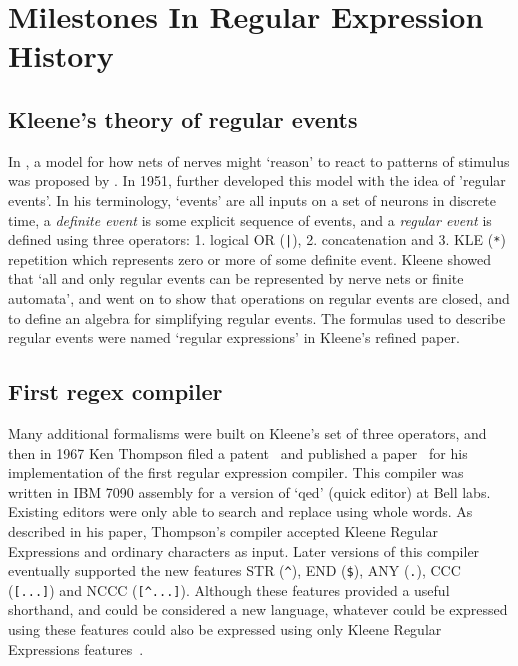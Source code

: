 \section{Milestones In Regular Expression History}

\subsection{Kleene's theory of regular events}
In \citeyear{McCulloch1943Logical}, a model for how nets of nerves might `reason' to react to patterns of stimulus was proposed by \citeauthor{McCulloch1943Logical}.  In 1951, \citeauthor{Kleene1951RAND} further developed this model with the idea of 'regular events'.  In his terminology, `events' are all inputs on a set of neurons in discrete time, a \emph{definite event} is some explicit sequence of events, and a \emph{regular event} is defined using three operators: 1. logical OR (\verb!|!), 2. concatenation and 3. KLE (\verb!*!) repetition which represents zero or more of some definite event.  Kleene showed that `all and only regular events can be represented by nerve nets or finite automata', and went on to show that operations on regular events are closed, and to define an algebra for simplifying regular events.  The formulas used to describe regular events were named `regular expressions' in Kleene's \citeyear{kleene56} refined paper.

\subsection{First regex compiler}
Many additional formalisms were built on Kleene's set of three operators, and then in 1967 Ken Thompson filed a patent~\cite{ThompsonBell1971} and published a paper~\cite{Thompson:1968:PTR:363347.363387} for his implementation of the first regular expression compiler.  This compiler was written in IBM 7090 assembly for a version of `qed' (quick editor) at Bell labs.  Existing editors were only able to search and replace using whole words.  As described in his paper, Thompson's compiler accepted Kleene Regular Expressions and ordinary characters as input.  Later versions of this compiler eventually supported the new features STR (\verb!^!), END (\verb!$!), ANY (\verb!.!), CCC (\verb![...]!) and NCCC (\verb![^...]!).  Although these features provided a useful shorthand, and could be considered a new language, whatever could be expressed using these features could also be expressed using only Kleene Regular Expressions features~\citep{Hopcroft:2006:IAT:1196416}.

